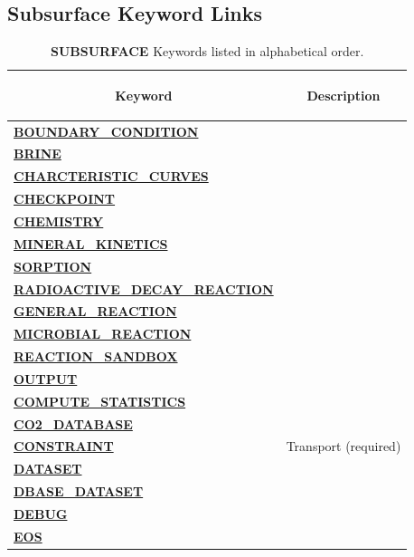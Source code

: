 \subsection{Subsurface Keyword Links}
\begin{longtable}{ll}%
\caption{{\bf SUBSURFACE} Keywords listed in alphabetical order.}\label{flkeywd}\\


\toprule[1.5pt]
\multicolumn{1}{c}{\hypertarget{target_key}{\bf Keyword}} & \multicolumn{1}{c}{\bf Description}\\
\midrule[1pt]
\hyperlink{target_bcon}{\bf BOUNDARY\_CONDITION} & \\
\hyperlink{target_brine}{\bf BRINE} & \\
\hyperlink{target_charcrv}{\bf CHARCTERISTIC\_CURVES} & \\
\hyperlink{target_ckpt}{\bf CHECKPOINT} & \\
\hyperlink{target_chem}{\bf CHEMISTRY} & \\
\qquad \hyperlink{target_chem_minkin}{\bf MINERAL\_KINETICS} &\\
\qquad \hyperlink{target_chem_sorp}{\bf SORPTION} &\\
\qquad \hyperlink{target_chem_rad}{\bf RADIOACTIVE\_DECAY\_REACTION} &\\
\qquad \hyperlink{target_chem_genrxn}{\bf GENERAL\_REACTION} &\\
\qquad \hyperlink{target_chem_micro}{\bf MICROBIAL\_REACTION} &\\
\qquad \hyperlink{target_chem_rxnsand}{\bf REACTION\_SANDBOX} &\\
\qquad \hyperlink{target_chem_output}{\bf OUTPUT} &\\
\hyperlink{target_stat}{\bf COMPUTE\_STATISTICS} & \\
\hyperlink{target_co2dat}{\bf CO2\_DATABASE} & \\
\hyperlink{target_constraint}{\bf CONSTRAINT} & Transport (required)\\
\hyperlink{target_datset}{\bf DATASET} & \\
\hyperlink{target_dbase}{\bf DBASE\_DATASET} & \\
\hyperlink{target_dbg}{\bf DEBUG} & \\
\hyperlink{target_eos}{\bf EOS} & \\

\end{longtable}
